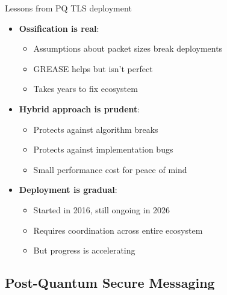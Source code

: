 \ifdefined\PRESENTATION\else\PassOptionsToClass{handout}{beamer}\fi\documentclass[aspectratio=169, lualatex]{beamer}
\begin{document}
\begin{frame}{Lessons from PQ TLS deployment}
	\begin{itemize}
		\item \textbf{Ossification is real}:
		      \begin{itemize}
			      \item Assumptions about packet sizes break deployments
			      \item GREASE helps but isn't perfect
			      \item Takes years to fix ecosystem
		      \end{itemize}
		\item \textbf{Hybrid approach is prudent}:
		      \begin{itemize}
			      \item Protects against algorithm breaks
			      \item Protects against implementation bugs
			      \item Small performance cost for peace of mind
		      \end{itemize}
		\item \textbf{Deployment is gradual}:
		      \begin{itemize}
			      \item Started in 2016, still ongoing in 2026
			      \item Requires coordination across entire ecosystem
			      \item But progress is accelerating
		      \end{itemize}
	\end{itemize}
\end{frame}

\subsection{Post-Quantum Secure Messaging}
\end{document}
